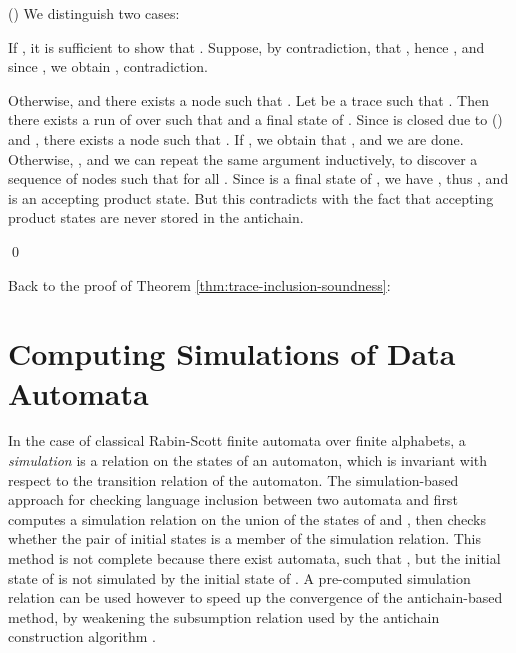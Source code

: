 \documentclass{llncs}
\begin{document}
{  \vspace*{\baselineskip}\noindent () We distinguish two cases:
  \begin{compactenum}
  \item If , it is
    sufficient to show that . Suppose, by contradiction, that
    , hence
    , and since , we obtain
    ,
    contradiction. 
\item Otherwise,  and
    there exists a node  such
    that . Let  be a trace such that
    . Then there exists a
    run  of  over  such that  and  a final state of . Since  is closed due to
    () and , there
    exists a node  such that
    . If , we
    obtain that , and we
    are done. Otherwise, ,
    and we can repeat the same argument inductively, to discover a
    sequence of nodes  such that
     for all . Since  is a
    final state of , we have
    , thus , and 
    is an accepting product state. But this contradicts with the fact
    that accepting product states are never stored in the antichain.
  \end{compactenum}
\qed}\bigskip

Back to the proof of Theorem \ref{thm:trace-inclusion-soundness}:


\section{Computing Simulations of Data Automata}
\label{sec:simulations}


In the case of classical Rabin-Scott finite automata over finite
alphabets, a \emph{simulation} \cite{milner} is a relation
on the states of an automaton, which is invariant with respect to the
transition relation of the automaton. The simulation-based approach
for checking language inclusion between two automata  and  first
computes a simulation relation on the union of the states of  and
, then checks whether the pair of initial states is a member of the
simulation relation. This method is not complete because there exist
automata, such that , but the
initial state of  is not simulated by the initial state of . A
pre-computed simulation relation can be used however to speed up the
convergence of the antichain-based method, by weakening the
subsumption relation used by the antichain construction algorithm
\cite{abdulla}.
\end{document}

